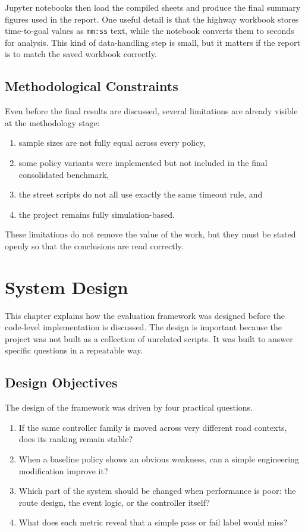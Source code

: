 \documentclass[12pt,a4paper]{report}
\begin{document}
Jupyter notebooks then load the compiled sheets and produce the final summary figures used in the report. One useful detail is that the highway workbook stores time-to-goal values as \texttt{mm:ss} text, while the notebook converts them to seconds for analysis. This kind of data-handling step is small, but it matters if the report is to match the saved workbook correctly.

\section{Methodological Constraints}
Even before the final results are discussed, several limitations are already visible at the methodology stage:

\begin{enumerate}[label=\arabic*.]
    \item sample sizes are not fully equal across every policy,
    \item some policy variants were implemented but not included in the final consolidated benchmark,
    \item the street scripts do not all use exactly the same timeout rule, and
    \item the project remains fully simulation-based.
\end{enumerate}

These limitations do not remove the value of the work, but they must be stated openly so that the conclusions are read correctly.

\chapter{System Design}

This chapter explains how the evaluation framework was designed before the code-level implementation is discussed. The design is important because the project was not built as a collection of unrelated scripts. It was built to answer specific questions in a repeatable way.

\section{Design Objectives}
The design of the framework was driven by four practical questions.

\begin{enumerate}[label=\arabic*.]
    \item If the same controller family is moved across very different road contexts, does its ranking remain stable?
    \item When a baseline policy shows an obvious weakness, can a simple engineering modification improve it?
    \item Which part of the system should be changed when performance is poor: the route design, the event logic, or the controller itself?
    \item What does each metric reveal that a simple pass or fail label would miss?
\end{enumerate}
\end{document}
